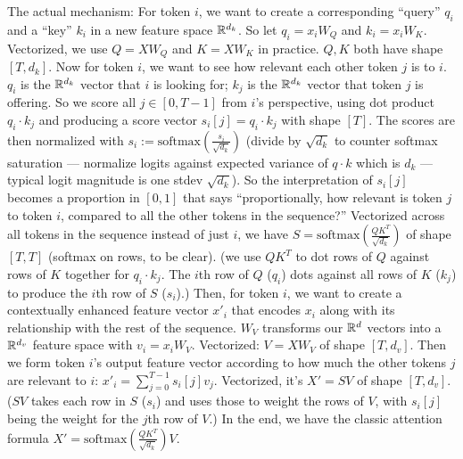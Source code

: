 \documentclass[12pt]{article}
\begin{document}
\begin{outline}
The actual mechanism:
\1 For token $i$, we want to create a corresponding ``query'' $q_i$ and a ``key'' $k_i$ in a new feature space $\mathbb{R}^{d_k}$.
\2 So let $q_i=x_iW_Q$ and $k_i=x_iW_K$. Vectorized, we use $\boxed{Q = XW_Q}$ and $\boxed{K = XW_K}$ in practice. $Q,K$ both have shape $[T,d_k]$.
\1 Now for token $i$, we want to see how relevant each other token $j$ is to $i$.
\2 $q_i$ is the $\mathbb{R}^{d_k}$ vector that $i$ is looking for; $k_j$ is the $\mathbb{R}^{d_k}$ vector that token $j$ is offering.
\2 So we score all $j \in [0,T-1]$ from $i$'s perspective, using dot product $q_i \cdot k_j$ and producing a score vector $s_i[j] = q_i \cdot k_j$ with shape $[T]$. The scores are then normalized with $\displaystyle s_i := \text{softmax}\left(\frac{s_i}{\sqrt{d_k}}\right)$ (divide by $\sqrt{d_k}$ to counter softmax saturation --- normalize logits against expected variance of $q \cdot k$ which is $d_k$ --- typical logit magnitude is one stdev $\sqrt{d_k}$).
\2 So the interpretation of $s_i[j]$ becomes a proportion in $[0,1]$ that says ``proportionally, how relevant is token $j$ to token $i$, compared to all the other tokens in the sequence?''
\2 Vectorized across all tokens in the sequence instead of just $i$, we have $\displaystyle \boxed{S = \text{softmax}\left(\frac{QK^T}{\sqrt{d_k}}\right)}$ of shape $[T,T]$ (softmax on rows, to be clear). (we use $QK^T$ to dot rows of $Q$ against rows of $K$ together for $q_i \cdot k_j$. The $i$th row of $Q$ ($q_i$) dots against all rows of $K$ ($k_j$) to produce the $i$th row of $S$ ($s_i$).)
\1 Then, for token $i$, we want to create a contextually enhanced feature vector $x'_i$ that encodes $x_i$ along with its relationship with the rest of the sequence.
\2 $W_V$ transforms our $\mathbb{R}^d$ vectors into a $\mathbb{R}^{d_v}$ feature space with $v_i = x_i W_V$. Vectorized: $\boxed{V = XW_V}$ of shape $[T,d_v]$.
\2 Then we form token $i$'s output feature vector according to how much the other tokens $j$ are relevant to $i$: $\displaystyle x'_i = \sum_{j=0}^{T-1} s_i[j] v_j$.
\2 Vectorized, it's $\boxed{X' = SV}$ of shape $[T,d_v]$. ($SV$ takes each row in $S$ ($s_i$) and uses those to weight the rows of $V$, with $s_i[j]$ being the weight for the $j$th row of $V$.)
\1 In the end, we have the classic attention formula $\displaystyle \boxed{X' = \text{softmax}\left(\frac{QK^T}{\sqrt{d_k}}\right)V}$.
\\\0


\end{outline}
\end{document}
